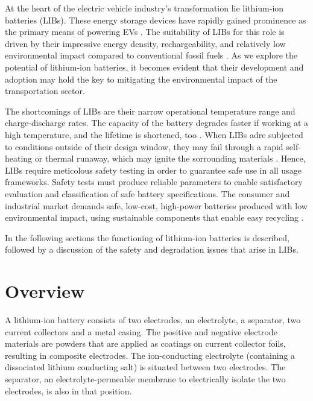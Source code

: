 
At the heart of the electric vehicle industry's transformation lie lithium-ion batteries (LIBs). These energy storage devices have rapidly gained prominence as the primary means of powering EVs \cite{zubi2018lithium,stampatori2020li}. The suitability of LIBs for this role is driven by their impressive energy density, rechargeability, and relatively low environmental impact compared to conventional fossil fuels \cite{korthauer2018lithium}. As we explore the potential of lithium-ion batteries, it becomes evident that their development and adoption may hold the key to mitigating the environmental impact of the transportation sector. 

The shortcomings of LIBs are their narrow operational temperature range and charge-discharge rates. The capacity of the battery degrades faster if working at a high temperature, and the lifetime is shortened, too \cite{ma2018temperature,ning2003capacity}. When LIBs adre subjected to conditions outside of their design window, they may fail through a rapid self-heating or thermal runaway, which may ignite the sorrounding materials \cite{palacin2016batteries}. 
Hence, LIBs require meticolous safety testing in order to guarantee safe use in all usage frameworks. Safety tests must produce reliable parameters to enable satisfactory evaluation and classification of safe battery specifications. The consumer and industrial market demands safe, low-cost, high-power batteries produced with low environmental impact, using sustainable components that enable easy recycling \cite{doughty2012general}.

In the following sections the functioning of lithium-ion batteries is described, followed by a discussion of the safety and degradation issues that arise in LIBs.

\section{Overview}
\label{sec:overview}
A lithium-ion battery consists of two electrodes, an electrolyte, a separator, two current collectors and a metal casing. The positive and negative electrode materials are powders that are applied as coatings on current collector foils, resulting in composite electrodes. The ion-conducting electrolyte (containing a dissociated lithium conducting salt) is situated between two electrodes. The separator, an electrolyte-permeable membrane to electrically isolate the two electrodes, is also in that position.

